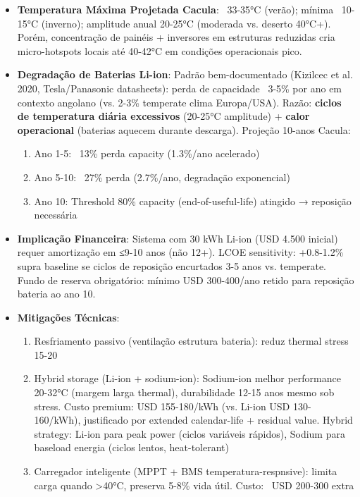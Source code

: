\documentclass[12pt, a4paper]{article}
\begin{document}
\begin{itemize}
\item \textbf{Temperatura Máxima Projetada Cacula}: ~33-35°C (verão); mínima ~10-15°C (inverno); amplitude anual 20-25°C (moderada vs. deserto 40°C+). Porém, concentração  de painéis + inversores em estruturas reduzidas cria micro-hotspots locais até 40-42°C em condições operacionais pico.
\item \textbf{Degradação de Baterias Li-ion}: Padrão bem-documentado (Kizilcec et al. 2020, Tesla/Panasonic datasheets): perda de capacidade ~3-5\% por ano em contexto angolano (vs. 2-3\% temperate clima Europa/USA). Razão: \textbf{ciclos de temperatura diária excessivos} (20-25°C amplitude) + \textbf{calor operacional} (baterias aquecem durante descarga). Projeção 10-anos Cacula:
  \begin{enumerate}
  \item Ano 1-5: ~13\% perda capacity (1.3\%/ano acelerado)
  \item Ano 5-10: ~27\% perda (2.7\%/ano, degradação exponencial)
  \item Ano 10: Threshold 80\% capacity (end-of-useful-life) atingido → reposição necessária
  \end{enumerate}
\item \textbf{Implicação Financeira}: Sistema com 30 kWh Li-ion (USD 4.500 inicial) requer amortização em ≤9-10 anos (não 12+). LCOE sensitivity: +0.8-1.2\% supra baseline se ciclos de reposição encurtados 3-5 anos vs. temperate. Fundo de reserva obrigatório: mínimo USD 300-400/ano retido para reposição bateria ao ano 10.
\item \textbf{Mitigações Técnicas}:
  \begin{enumerate}
  \item Resfriamento passivo (ventilação estrutura bateria): reduz thermal stress 15-20%
  \item Hybrid storage (Li-ion + sodium-ion): Sodium-ion melhor performance 20-32°C (margem larga thermal), durabilidade 12-15 anos mesmo sob stress. Custo premium: USD 155-180/kWh (vs. Li-ion USD 130-160/kWh), justificado por extended calendar-life + residual value. Hybrid strategy: Li-ion para peak power (ciclos variáveis rápidos), Sodium para baseload energia (ciclos lentos, heat-tolerant)
  \item Carregador inteligente (MPPT + BMS temperatura-respnsive): limita carga quando >40°C, preserva 5-8\% vida útil. Custo: ~USD 200-300 extra
  \end{enumerate}
\end{itemize}
\end{document}
